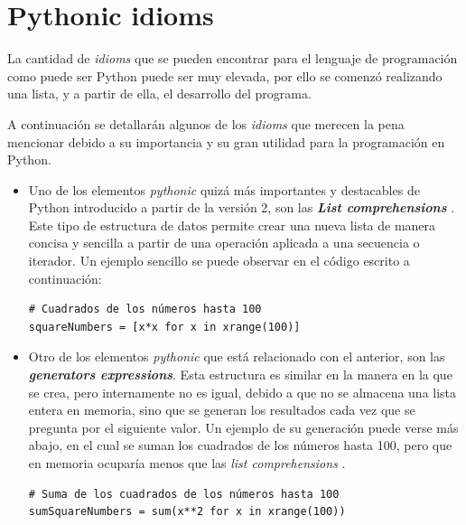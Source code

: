 \documentclass[a4paper, 12pt]{book}
\begin{document}
\chapter{Pythonic idioms}  
\label{app:idioms}

La cantidad de \textit{idioms} que se pueden encontrar para el lenguaje de programación como puede ser Python puede ser muy elevada, por ello se comenzó realizando una lista, y a partir de ella, el desarrollo del programa.

A continuación se detallarán algunos de los \textit{idioms} que merecen la pena mencionar debido a su importancia y su gran utilidad para la programación en Python.



\begin{itemize}


\item Uno de los elementos \textit{pythonic} quizá más importantes y destacables de Python introducido a partir de la versión 2, son las \textbf{\textit{List comprehensions}} \cite{lutz2014pythonlistcomp}. Este tipo de estructura de datos permite crear una nueva lista de manera concisa y sencilla a partir de una operación aplicada a una secuencia o iterador. Un ejemplo sencillo se puede observar en el código escrito a continuación:

\begin{verbatim}
# Cuadrados de los números hasta 100
squareNumbers = [x*x for x in xrange(100)]
\end{verbatim}



\item Otro de los elementos \textit{pythonic} que está relacionado con el anterior, son las \textbf{\textit{generators expressions}}. Esta estructura es similar en la manera en la que se crea, pero internamente no es igual, debido a que no se almacena una lista entera en memoria, sino que se generan los resultados cada vez que se pregunta por el siguiente valor. Un ejemplo de su generación puede verse más abajo, en el cual se suman los cuadrados de los números hasta 100, pero que en memoria ocuparía menos que las \textit{list comprehensions} \cite{ramalho2015fluent}.

\begin{verbatim}
# Suma de los cuadrados de los números hasta 100
sumSquareNumbers = sum(x**2 for x in xrange(100))
\end{verbatim}




\end{itemize}
\end{document}
